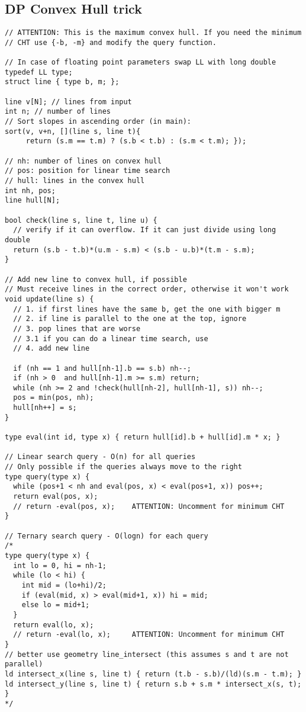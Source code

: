 \documentclass[12pt,a4paper,onesided]{article}
\begin{document}
\begin{multicols}{3}
\subsection{DP Convex Hull trick}
\begin{lstlisting}
// ATTENTION: This is the maximum convex hull. If you need the minimum
// CHT use {-b, -m} and modify the query function.

// In case of floating point parameters swap LL with long double
typedef LL type;
struct line { type b, m; };

line v[N]; // lines from input
int n; // number of lines
// Sort slopes in ascending order (in main):
sort(v, v+n, [](line s, line t){
     return (s.m == t.m) ? (s.b < t.b) : (s.m < t.m); });

// nh: number of lines on convex hull
// pos: position for linear time search
// hull: lines in the convex hull
int nh, pos;
line hull[N];

bool check(line s, line t, line u) {
  // verify if it can overflow. If it can just divide using long double
  return (s.b - t.b)*(u.m - s.m) < (s.b - u.b)*(t.m - s.m);
}

// Add new line to convex hull, if possible
// Must receive lines in the correct order, otherwise it won't work
void update(line s) {
  // 1. if first lines have the same b, get the one with bigger m
  // 2. if line is parallel to the one at the top, ignore
  // 3. pop lines that are worse
  // 3.1 if you can do a linear time search, use 
  // 4. add new line

  if (nh == 1 and hull[nh-1].b == s.b) nh--;
  if (nh > 0  and hull[nh-1].m >= s.m) return;
  while (nh >= 2 and !check(hull[nh-2], hull[nh-1], s)) nh--;
  pos = min(pos, nh);
  hull[nh++] = s;
}

type eval(int id, type x) { return hull[id].b + hull[id].m * x; }

// Linear search query - O(n) for all queries
// Only possible if the queries always move to the right
type query(type x) {
  while (pos+1 < nh and eval(pos, x) < eval(pos+1, x)) pos++;
  return eval(pos, x);
  // return -eval(pos, x);    ATTENTION: Uncomment for minimum CHT
}

// Ternary search query - O(logn) for each query
/*
type query(type x) {
  int lo = 0, hi = nh-1;
  while (lo < hi) {
    int mid = (lo+hi)/2;
    if (eval(mid, x) > eval(mid+1, x)) hi = mid;
    else lo = mid+1;
  }
  return eval(lo, x);
  // return -eval(lo, x);     ATTENTION: Uncomment for minimum CHT
}
// better use geometry line_intersect (this assumes s and t are not parallel)
ld intersect_x(line s, line t) { return (t.b - s.b)/(ld)(s.m - t.m); }
ld intersect_y(line s, line t) { return s.b + s.m * intersect_x(s, t); }
*/
\end{lstlisting}



\end{multicols}
\end{document}
